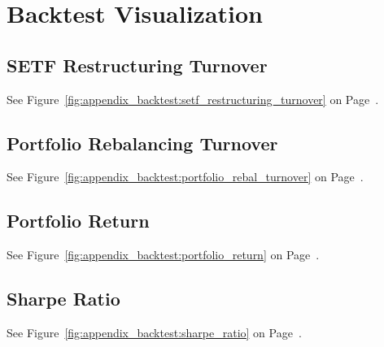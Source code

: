 \documentclass[../main.tex]{subfiles}
\begin{document}
\appendix
\renewcommand\chaptername{Appendix}  %






\chapter{Backtest Visualization} \label{appendix:backtest_visualization}


\section*{SETF Restructuring Turnover}

See Figure~\ref{fig:appendix_backtest:setf_restructuring_turnover} on Page~\pageref{fig:appendix_backtest:setf_restructuring_turnover}.


\section*{Portfolio Rebalancing Turnover}

See Figure~\ref{fig:appendix_backtest:portfolio_rebal_turnover} on Page~\pageref{fig:appendix_backtest:portfolio_rebal_turnover}.


\section*{Portfolio Return}

See Figure~\ref{fig:appendix_backtest:portfolio_return} on Page~\pageref{fig:appendix_backtest:portfolio_return}.

\section*{Sharpe Ratio}

See Figure~\ref{fig:appendix_backtest:sharpe_ratio} on Page~\pageref{fig:appendix_backtest:sharpe_ratio}.
\end{document}
